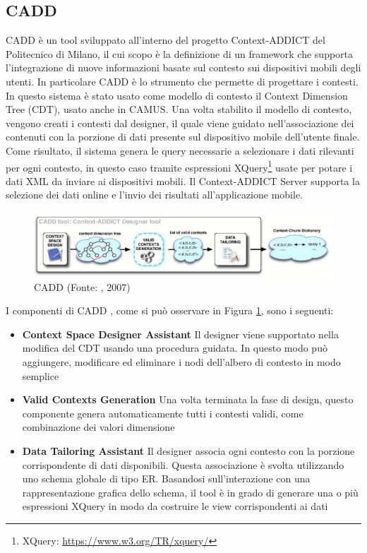 \subsection*{CADD}

CADD \cite{bolchini2007cadd} è un tool sviluppato all'interno del progetto Context-ADDICT del Politecnico di Milano, il cui scopo è la definizione di un framework che supporta l'integrazione di nuove informazioni basate sul contesto sui dispositivi mobili degli utenti. In particolare CADD è lo strumento che permette di progettare i contesti. In questo sistema è stato usato come modello di contesto il Context Dimension Tree (CDT), usato anche in CAMUS.  Una volta stabilito il modello di contesto, vengono creati i contesti dal designer, il quale viene guidato nell'associazione dei contenuti con la porzione di dati presente sul dispositivo mobile dell'utente finale. Come risultato, il sistema genera le query necessarie a selezionare i dati rilevanti per ogni contesto, in questo caso tramite espressioni XQuery\footnote{XQuery: \url{https://www.w3.org/TR/xquery/}} usate per potare i dati XML da inviare ai dispositivi mobili.
Il Context-ADDICT Server supporta la selezione dei dati online e l'invio dei risultati all'applicazione mobile. 

\begin{figure}[ht]
	\centering
	\includegraphics[width=\textwidth]{2-preliminari/Immagini/cadd.png}
	\caption[CADD]{CADD (Fonte: , 2007)}\label{fig:cadd}
\end{figure}

I componenti di CADD , come si può osservare in Figura  \ref{fig:cadd}, sono i seguenti:

\begin{itemize}
	\item \textbf{Context Space Designer Assistant}
	Il designer viene supportato nella modifica del CDT usando una procedura guidata. In questo modo può aggiungere, modificare ed eliminare i nodi dell'albero di contesto in modo semplice
	\item \textbf{Valid Contexts Generation}
	Una volta terminata la fase di design, questo componente genera automaticamente tutti i contesti validi, come combinazione dei valori dimensione
	\item \textbf{Data Tailoring Assistant}
	Il designer associa ogni contesto con la porzione corrispondente di dati disponibili. Questa associazione è svolta utilizzando uno schema globale di tipo ER. Basandosi sull'interazione con una rappresentazione grafica dello schema, il tool è in grado di generare una o più espressioni XQuery in modo da costruire le view corrispondenti ai dati
\end{itemize}

